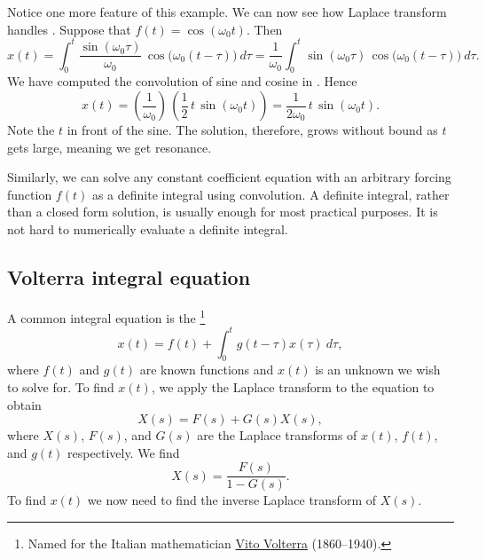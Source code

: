 Notice one more feature of this example.
We can now see how Laplace transform
handles .  Suppose that $f(t) =
\cos (\omega_0 t)$.  Then
\begin{equation*}
x(t) = 
\int_0^t
\frac{\sin (\omega_0 \tau)}{\omega_0} \,
\cos \bigl( \omega_0 (t-\tau) \bigr) ~ d\tau
=
\frac{1}{\omega_0}
\int_0^t
\sin ( \omega_0 \tau ) \,
\cos \bigl(\omega_0 (t-\tau) \bigr) ~ d\tau .
\end{equation*}
We have computed the convolution of sine and cosine in
.  Hence
\begin{equation*}
x(t) =
\left(
\frac{1}{\omega_0}
\right) \,
\left(
\frac{1}{2} \,
t \,
\sin ( \omega_0 t )
\right)
=
\frac{1}{2 \omega_0} \,
t
\,
\sin ( \omega_0 t ).
\end{equation*}
Note the $t$ in front of the sine.  The solution, therefore, grows without
bound as $t$ gets large, meaning we get resonance.

Similarly,
we can solve any constant coefficient equation with an arbitrary forcing
function $f(t)$ as a definite integral using convolution.
A definite integral, rather than a closed form solution, is usually enough
for most practical purposes.  It is
not hard to numerically evaluate a definite integral.

\subsection{Volterra integral equation}

A common integral equation
is the \emph{}%
\footnote{Named for the Italian mathematician
\href{https://en.wikipedia.org/wiki/Vito_Volterra}{Vito Volterra}
(1860--1940).}
\begin{equation*}
x(t) = f(t) + \int_0^t g(t-\tau) x(\tau) ~ d\tau ,
\end{equation*}
where $f(t)$ and $g(t)$ are known functions and $x(t)$ is an unknown we
wish to solve for.
To find $x(t)$,
we apply the Laplace transform to the equation to obtain 
\begin{equation*}
X(s) = F(s) + G(s) X(s) ,
\end{equation*}
where $X(s)$, $F(s)$, and $G(s)$ are the Laplace transforms of $x(t)$, $f(t)$, and
$g(t)$ respectively.  We find
\begin{equation*}
X(s) = \frac{F(s)}{1-G(s)} .
\end{equation*}
To find $x(t)$ we now need to find the 
inverse Laplace transform of $X(s)$.

